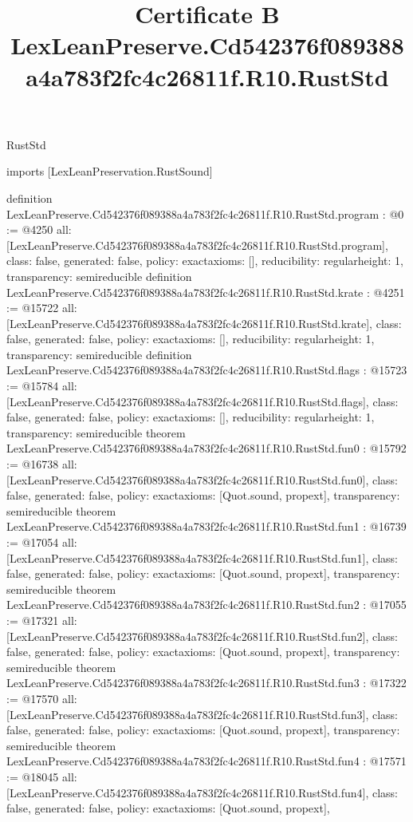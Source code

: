 \begin{lexlean}{RustStd}
\title{Certificate B LexLeanPreserve.Cd542376f089388a4a783f2fc4c26811f.R10.RustStd}
\begin{coremodule}
imports [LexLeanPreservation.RustSound]

definition LexLeanPreserve.Cd542376f089388a4a783f2fc4c26811f.R10.RustStd.program : @0 := @4250 {
  all: [LexLeanPreserve.Cd542376f089388a4a783f2fc4c26811f.R10.RustStd.program],
  class: false,
  generated: false,
  policy: exact{axioms: []},
  reducibility: regular{height: 1},
  transparency: semireducible
}
definition LexLeanPreserve.Cd542376f089388a4a783f2fc4c26811f.R10.RustStd.krate : @4251 := @15722 {
  all: [LexLeanPreserve.Cd542376f089388a4a783f2fc4c26811f.R10.RustStd.krate],
  class: false,
  generated: false,
  policy: exact{axioms: []},
  reducibility: regular{height: 1},
  transparency: semireducible
}
definition LexLeanPreserve.Cd542376f089388a4a783f2fc4c26811f.R10.RustStd.flags : @15723 := @15784 {
  all: [LexLeanPreserve.Cd542376f089388a4a783f2fc4c26811f.R10.RustStd.flags],
  class: false,
  generated: false,
  policy: exact{axioms: []},
  reducibility: regular{height: 1},
  transparency: semireducible
}
theorem LexLeanPreserve.Cd542376f089388a4a783f2fc4c26811f.R10.RustStd.fun0 : @15792 := @16738 {
  all: [LexLeanPreserve.Cd542376f089388a4a783f2fc4c26811f.R10.RustStd.fun0],
  class: false,
  generated: false,
  policy: exact{axioms: [Quot.sound, propext]},
  transparency: semireducible
}
theorem LexLeanPreserve.Cd542376f089388a4a783f2fc4c26811f.R10.RustStd.fun1 : @16739 := @17054 {
  all: [LexLeanPreserve.Cd542376f089388a4a783f2fc4c26811f.R10.RustStd.fun1],
  class: false,
  generated: false,
  policy: exact{axioms: [Quot.sound, propext]},
  transparency: semireducible
}
theorem LexLeanPreserve.Cd542376f089388a4a783f2fc4c26811f.R10.RustStd.fun2 : @17055 := @17321 {
  all: [LexLeanPreserve.Cd542376f089388a4a783f2fc4c26811f.R10.RustStd.fun2],
  class: false,
  generated: false,
  policy: exact{axioms: [Quot.sound, propext]},
  transparency: semireducible
}
theorem LexLeanPreserve.Cd542376f089388a4a783f2fc4c26811f.R10.RustStd.fun3 : @17322 := @17570 {
  all: [LexLeanPreserve.Cd542376f089388a4a783f2fc4c26811f.R10.RustStd.fun3],
  class: false,
  generated: false,
  policy: exact{axioms: [Quot.sound, propext]},
  transparency: semireducible
}
theorem LexLeanPreserve.Cd542376f089388a4a783f2fc4c26811f.R10.RustStd.fun4 : @17571 := @18045 {
  all: [LexLeanPreserve.Cd542376f089388a4a783f2fc4c26811f.R10.RustStd.fun4],
  class: false,
  generated: false,
  policy: exact{axioms: [Quot.sound, propext]},
}
\end{coremodule}
\end{lexlean}
